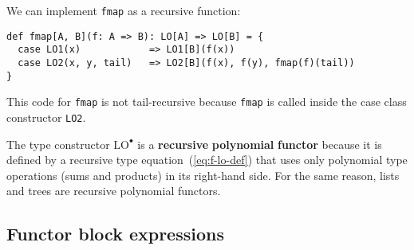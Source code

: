 We can implement \lstinline!fmap! as a recursive function:
\begin{lstlisting}
def fmap[A, B](f: A => B): LO[A] => LO[B] = {
  case LO1(x)            => LO1[B](f(x))
  case LO2(x, y, tail)   => LO2[B](f(x), f(y), fmap(f)(tail))
}
\end{lstlisting}
This code for \lstinline!fmap! is not tail-recursive because \lstinline!fmap!
is called inside the case class constructor \lstinline!LO2!. 

The type constructor $\text{LO}^{\bullet}$ is a \textbf{recursive}
\textbf{polynomial} \textbf{functor}
because it is defined by a recursive type equation~(\ref{eq:f-lo-def})
that uses only polynomial type operations (sums and products) in its
right-hand side. For the same reason, lists and trees are recursive
polynomial functors.

\subsection{Functor block expressions}

